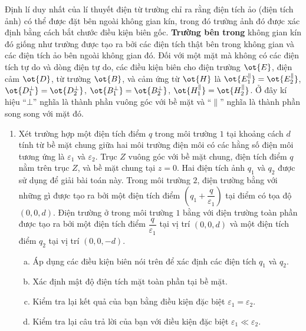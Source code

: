\begin{vd}
\begin{center}
\begin{tikzpicture}[x=0.75pt,y=0.75pt,yscale=-1,xscale=1]
\end{tikzpicture}
    \end{center}
Định lí duy nhất của lí thuyết điện từ trường chỉ ra rằng điện tích ảo (điện tích ảnh) có thể được đặt bên ngoài không gian kín, trong đó trường ảnh đó được xác định bằng cách bắt chước điều kiện biên gốc. \textbf{Trường bên trong} không gian kín đó giống như trường được tạo ra bởi các điện tích thật bên trong không gian và các điện tích ảo bên ngoài không gian đó. Đối với một mặt mà không có các điện tích tự do và dòng điện tự do, các điều kiện biên cho điện trường $\ot{E}$, điện cảm $\ot{D}$, từ trường $\ot{B}$, và cảm ứng từ $\ot{H}$ là $\ot{E^{\parallel}_1}=\ot{E^{\parallel}_2}$, $\ot{D_1^{\bot}}=\ot{D_2^{\bot}}$, $\ot{B_1^{\bot}}=\ot{B_2^{\bot}}$, $\ot{H^{\parallel}_1}=\ot{H^{\parallel}_2}$. Ở đây kí hiệu ``$\bot$'' nghĩa là thành phần vuông góc với bề mặt và ``$\parallel$'' nghĩa là thành phần song song với mặt đó.
\begin{enumerate}[1) ]
    \item Xét trường hợp một điện tích điểm $q$ trong môi trường $1$ tại khoảng cách $d$ tính từ bề mặt chung giữa hai môi trường điện môi có các hằng số điện môi tương ứng là $\varepsilon_1$ và $\varepsilon_2$. Trục $Z$ vuông góc với bề mặt chung, điện tích điểm $q$ nằm trên trục $Z$, và bề mặt chung tại $z=0$. Hai điện tích ảnh $q_1$ và $q_2$ được sử dụng để giải bài toán này. Trong môi trường $2$, điện trường bằng với những gì được tạo ra bởi một điện tích điểm $(q_1+\dfrac{q}{\varepsilon_1})$ tại điểm có tọa độ $(0,0,d)$. Điện trường ở trong môi trường $1$ bằng với điện trường toàn phần được tạo ra bởi một điện tích điểm $\dfrac{q}{\varepsilon_1}$ tại vị trí $(0,0,d)$ và một điện tích điểm $q_2$ tại vị trí $(0,0,-d)$.
    \begin{enumerate}[a) ]
        \item Áp dụng các điều kiện biên nói trên để xác định các điện tích $q_1$ và $q_2$.
        \item Xác định mật độ điện tích mặt toàn phần tại bề mặt.
        \item Kiểm tra lại kết quả của bạn bằng điều kiện đặc biệt $\varepsilon_1=\varepsilon_2$.
        \item Kiểm tra lại câu trả lời của bạn với điều kiện đặc biệt $\varepsilon_1\ll\varepsilon_2$.
    \end{enumerate}

\end{enumerate}
\end{vd}
